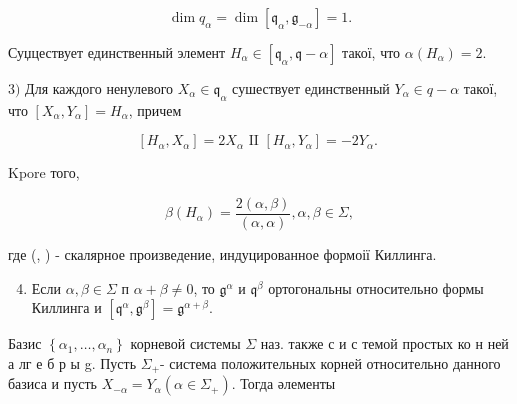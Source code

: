 \documentclass[10pt]{article}
\begin{document}
\[

\operatorname{dim} q_{\alpha}=\operatorname{dim}\left[\mathfrak{q}_{\alpha}, \mathfrak{g}_{-\alpha}\right]=1 .

\]



Суџцествует единственный элемент $H_{\alpha} \in\left[\mathfrak{q}_{\alpha}, \mathfrak{q}-\alpha\right]$ такої, что $\alpha\left(H_{\alpha}\right)=2$.



$3)$ Для каждого ненулевого $X_{\alpha} \in \mathfrak{q}_{\alpha}$ сушествует единственный $Y_{\alpha} \in q-\alpha$ такої, что $\left[X_{\alpha}, Y_{\alpha}\right]=H_{\alpha}$, причем



\[

\left[H_{\alpha}, X_{\alpha}\right]=2 X_{\alpha} \text { II }\left[H_{\alpha}, Y_{\alpha}\right]=-2 Y_{\alpha} \text {. }

\]



Kpore того,



\[

\beta\left(H_{\alpha}\right)=\frac{2(\alpha, \beta)}{(\alpha, \alpha)}, \alpha, \beta \in \Sigma,

\]



где (, ) - скалярное произведение, индуцированное формоії Киллинга.



\begin{enumerate}

  \setcounter{enumi}{3}

  \item Если $\alpha, \beta \in \Sigma$ п $\alpha+\beta \neq 0$, то $\mathfrak{g}^{\alpha}$ и $\mathfrak{q}^{\beta}$ ортогональны относительно формы Киллинга и $\left[\mathfrak{q}^{\alpha}, \mathfrak{g}^{\beta}\right]=\mathfrak{g}^{\alpha+\beta}$.

\end{enumerate}



Базис $\left\{\alpha_{1}, \ldots, \alpha_{n}\right\}$ корневой системы $\Sigma$ наз. также с и с темой простых ко н ней а лг е б р ы g. Пусть $\Sigma_{+}$- система положительных корней относительно данного базиса и пусть $X_{-\alpha}=Y_{\alpha}\left(\alpha \in \Sigma_{+}\right)$. Тогда әлементы
\end{document}
